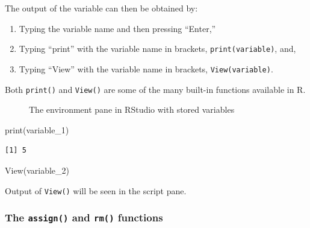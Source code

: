\documentclass[
  letterpaper,
  DIV=11,
  numbers=noendperiod]{scrreprt}
\newenvironment{Shaded}{\begin{snugshade}}{\end{snugshade}}
\newcommand{\FunctionTok}[1]{\textcolor[rgb]{0.28,0.35,0.67}{#1}}
\newcommand{\NormalTok}[1]{\textcolor[rgb]{0.00,0.23,0.31}{#1}}
\begin{document}
The output of the variable can then be obtained by:

\begin{enumerate}
\def\labelenumi{\arabic{enumi}.}
\item
  Typing the variable name and then pressing ``Enter,''
\item
  Typing ``print'' with the variable name in brackets,
  \texttt{print(variable)}, and,
\item
  Typing ``View'' with the variable name in brackets,
  \texttt{View(variable)}.
\end{enumerate}

Both \texttt{print()} and \texttt{View()} are some of the many built-in
functions available in R.

\begin{figure}


\caption{\label{fig-environment-1}The environment pane in RStudio with
stored variables}

\end{figure}%

\begin{Shaded}
\begin{Highlighting}[]
\FunctionTok{print}\NormalTok{(variable\_1)}
\end{Highlighting}
\end{Shaded}

\begin{verbatim}
[1] 5
\end{verbatim}

\begin{Shaded}
\begin{Highlighting}[]
\FunctionTok{View}\NormalTok{(variable\_2)}
\end{Highlighting}
\end{Shaded}

Output of \texttt{View()} will be seen in the script pane.

\subsubsection{\texorpdfstring{The \texttt{assign()} and \texttt{rm()}
functions}{The assign() and rm() functions}}\label{the-assign-and-rm-functions}
\end{document}

